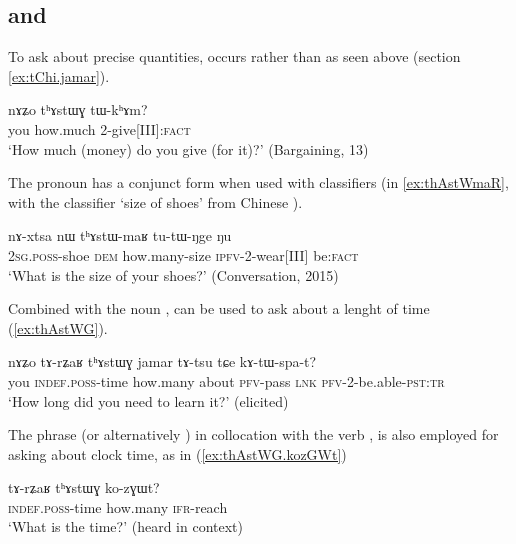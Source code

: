 \subsection{ and } \label{sec:thAstWG}

To ask about precise quantities,  occurs rather than  as seen above (section \ref{ex:tChi.jamar}).

\begin{exe}
\ex \label{ex:thAstWG.tWkhAm}
 \gll    nɤʑo 	tʰɤstɯɣ 	tɯ-kʰɤm?    \\
 you how.much 2-give[III]:\textsc{fact}  \\
\glt  `How much (money) do you give (for it)?' (Bargaining, 13)
\end{exe} 

The pronoun  has a conjunct form  when used with classifiers (in \ref{ex:thAstWmaR}, with the classifier  `size of shoes' from Chinese  ).

 \begin{exe}
\ex \label{ex:thAstWmaR}
 \gll   nɤ-xtsa nɯ tʰɤstɯ-maʁ tu-tɯ-ŋge ŋu   \\
\textsc{2sg.poss}-shoe \textsc{dem} how.many-size \textsc{ipfv}-2-wear[III] be:\textsc{fact} \\ 
\glt `What is the size of your shoes?'  (Conversation, 2015)
\end{exe} 

Combined with the noun , 	 can be used to ask about a lenght of time (\ref{ex:thAstWG}).

\begin{exe}
\ex \label{ex:thAstWG}
 \gll   nɤʑo 	tɤ-rʑaʁ 	tʰɤstɯɣ 	jamar 	tɤ-tsu tɕe 	kɤ-tɯ-spa-t?  \\
 you \textsc{indef.poss}-time how.many about \textsc{pfv}-pass \textsc{lnk} \textsc{pfv}-2-be.able-\textsc{pst:tr} \\
\glt   `How long did you need to learn it?' (elicited)
\end{exe} 

The phrase  (or alternatively ) in collocation with the verb , is also employed for asking about clock time, as in (\ref{ex:thAstWG.kozGWt})

 \begin{exe}
\ex \label{ex:thAstWG.kozGWt}
 \gll   tɤ-rʑaʁ 	tʰɤstɯɣ ko-zɣɯt? \\
  \textsc{indef.poss}-time how.many  \textsc{ifr}-reach \\
  \glt `What is the time?' (heard in context)
  \end{exe} 
  
